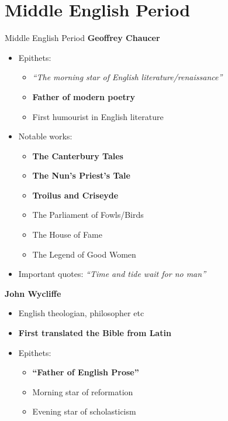 \documentclass[
  12pt,
    progressbar=frametitle]{beamer}
\providecommand{\tightlist}{%
  \setlength{\itemsep}{0pt}\setlength{\parskip}{0pt}}
\begin{document}
\section{Middle English Period}
\begin{frame}[allowframebreaks]
{Middle English Period}
\large\textbf{Geoffrey Chaucer}\normalsize\vspace{-3mm}

\begin{itemize}
\tightlist
\item
  Epithets:

  \begin{itemize}
  \tightlist
  \item
    \emph{``The morning star of English literature/renaissance''}
  \item
    \textbf{Father of modern poetry}
  \item
    First humourist in English literature
  \end{itemize}
\item
  Notable works:

  \begin{itemize}
  \tightlist
  \item
    \textbf{The Canterbury Tales}
  \item
    \textbf{The Nun's Priest's Tale}
  \item
    \textbf{Troilus and Criseyde}
  \item
    The Parliament of Fowls/Birds
  \item
    The House of Fame
  \item
    The Legend of Good Women
  \end{itemize}
\item
  Important quotes: \emph{``Time and tide wait for no man''}
\end{itemize}

\large\textbf{John Wycliffe}\normalsize\vspace{-3mm}

\begin{itemize}
\tightlist
\item
  English theologian, philosopher etc
\item
  \textbf{First translated the Bible from Latin}
\item
  Epithets:

  \begin{itemize}
  \tightlist
  \item
    \textbf{``Father of English Prose''}
  \item
    Morning star of reformation
  \item
    Evening star of scholasticism
  \end{itemize}
\end{itemize}


\end{frame}
\end{document}
